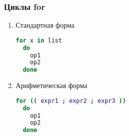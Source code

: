 \begin{frame}[fragile]
  \frametitle{Циклы for}
  \begin{enumerate}
    \item Стандартная форма
\begin{lstlisting}[language=bash,frame=single]
  for x in list 
  do
    op1
    op2
  done
\end{lstlisting}
    \item Арифметическая форма
\begin{lstlisting}[language=bash,frame=single]
  for (( expr1 ; expr2 ; expr3 )) 
  do 
    op1
    op2
  done
\end{lstlisting}
  \end{enumerate}
\end{frame}
